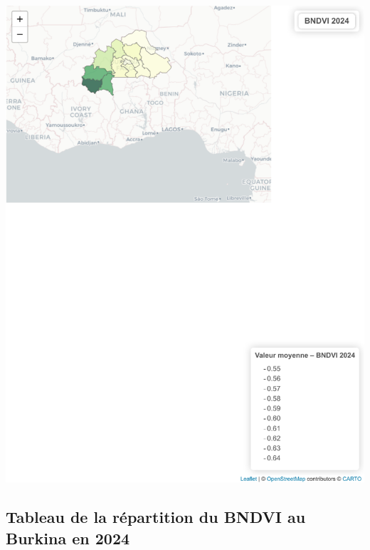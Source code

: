 \documentclass[
]{book}
\begin{document}
\includegraphics{Atlas-Spectral-Sahel_files/figure-latex/vegetation-bndvi-1.pdf}

\subsection{Tableau de la répartition du BNDVI au Burkina en 2024}\label{tableau-de-la-ruxe9partition-du-bndvi-au-burkina-en-2024}
\end{document}
